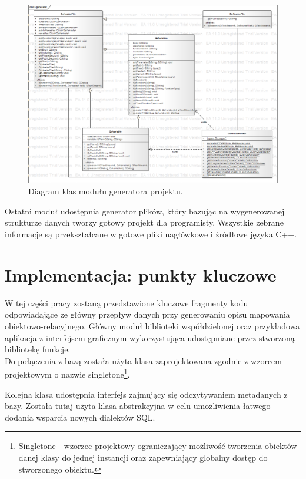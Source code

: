 \documentclass[12pt]{report}
\let\oldaddcontentsline\addcontentsline
\newcommand{\lstinputcplusplus}[2][]{{%
  \renewcommand{\lstlistingname}{C++ Code}%
  \renewcommand{\addcontentsline}[3]{\oldaddcontentsline{loc}{##2}{##3}}%
}}
\begin{document}
\begin{figure}[h]
	\centering
	\includegraphics[width=1.1\textwidth]{images/generator.png}
	\caption{Diagram klas modułu generatora projektu.}
\end{figure}
\FloatBarrier	

Ostatni moduł udostępnia generator plików, który bazując na wygenerowanej strukturze danych tworzy gotowy projekt dla programisty. Wszystkie zebrane informacje są przekształcane w gotowe pliki nagłówkowe i źródłowe języka C++.

\section{Implementacja: punkty kluczowe}
W tej części pracy zostaną przedstawione kluczowe fragmenty kodu odpowiadające ze główny przepływ danych przy generowaniu opisu mapowania obiektowo-relacyjnego. Główny moduł biblioteki współdzielonej oraz przykładowa aplikacja z interfejsem graficznym wykorzystująca udostępniane przez stworzoną bibliotekę funkcje. \\
	\indent Do połączenia z bazą została użyta klasa zaprojektowana zgodnie z wzorcem projektowym o nazwie singletone\footnote{Singletone - wzorzec projektowy ograniczający możliwość tworzenia obiektów danej klasy do jednej instancji oraz zapewniający globalny dostęp do stworzonego obiektu.}.
	
\begin{framed}
\lstinputcplusplus[caption={QcDatabase}]{additional/qcdatabase.h}
\end{framed}

Kolejna klasa udostępnia interfejs zajmujący się odczytywaniem metadanych z bazy. Została tutaj użyta klasa abstrakcyjna w celu umożliwienia łatwego dodania wsparcia nowych dialektów SQL.
\end{document}
